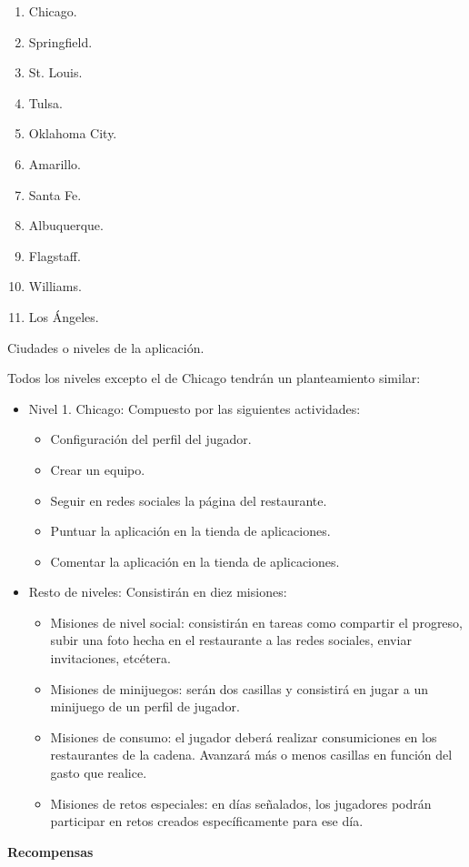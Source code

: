 \documentclass[twoside]{report}
\begin{document}
\begin{table}[H]
\begin{multicols}{4}
\begin{enumerate}
\item Chicago.
\item Springfield.
\item St. Louis.
\item Tulsa.
\item Oklahoma City.
\item Amarillo.
\item Santa Fe.
\item Albuquerque.
\item Flagstaff.
\item Williams.
\item Los Ángeles.
\end{enumerate}
\end{multicols}
\caption{Ciudades o niveles de la aplicación.}
\end{table}


Todos los niveles excepto el de Chicago tendrán un planteamiento similar:
\begin{itemize}
\item Nivel 1. Chicago: Compuesto por las siguientes actividades:
	\begin{itemize}
		\item Configuración del perfil del jugador.
		\item Crear un equipo.
		\item Seguir en redes sociales la página del restaurante.
		\item Puntuar la aplicación en la tienda de aplicaciones.
		\item Comentar la aplicación en la tienda de aplicaciones.
	\end{itemize}
\item Resto de niveles: Consistirán en diez misiones:
	\begin{itemize}
		\item Misiones de nivel social: consistirán en tareas como compartir el progreso, subir una foto hecha en el restaurante a las redes sociales, enviar invitaciones, etcétera.
		
		\item Misiones de minijuegos: serán dos casillas y consistirá en jugar a un minijuego de un perfil de jugador.
		
		\item Misiones de consumo: el jugador deberá realizar consumiciones en los restaurantes de la cadena. Avanzará más o menos casillas en función del gasto que realice.
		
		\item Misiones de retos especiales: en días señalados, los jugadores podrán participar en retos creados específicamente para ese día.
	\end{itemize}
\end{itemize}
\vspace{1cm}
\textbf{Recompensas}\\
\end{document}
